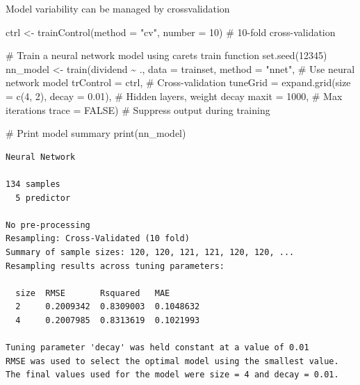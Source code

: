 \documentclass[
  letterpaper,
  DIV=11,
  numbers=noendperiod,
  oneside]{scrartcl}
\newenvironment{Shaded}{\begin{snugshade}}{\end{snugshade}}
\newcommand{\AttributeTok}[1]{\textcolor[rgb]{0.40,0.45,0.13}{#1}}
\newcommand{\CommentTok}[1]{\textcolor[rgb]{0.37,0.37,0.37}{#1}}
\newcommand{\ConstantTok}[1]{\textcolor[rgb]{0.56,0.35,0.01}{#1}}
\newcommand{\DecValTok}[1]{\textcolor[rgb]{0.68,0.00,0.00}{#1}}
\newcommand{\FloatTok}[1]{\textcolor[rgb]{0.68,0.00,0.00}{#1}}
\newcommand{\FunctionTok}[1]{\textcolor[rgb]{0.28,0.35,0.67}{#1}}
\newcommand{\NormalTok}[1]{\textcolor[rgb]{0.00,0.23,0.31}{#1}}
\newcommand{\OtherTok}[1]{\textcolor[rgb]{0.00,0.23,0.31}{#1}}
\newcommand{\SpecialCharTok}[1]{\textcolor[rgb]{0.37,0.37,0.37}{#1}}
\newcommand{\StringTok}[1]{\textcolor[rgb]{0.13,0.47,0.30}{#1}}
\begin{document}
Model variability can be managed by crossvalidation

\begin{Shaded}
\begin{Highlighting}[]
\NormalTok{ctrl }\OtherTok{\textless{}{-}} \FunctionTok{trainControl}\NormalTok{(}\AttributeTok{method =} \StringTok{"cv"}\NormalTok{, }\AttributeTok{number =} \DecValTok{10}\NormalTok{)  }\CommentTok{\# 10{-}fold cross{-}validation}
\end{Highlighting}
\end{Shaded}

\begin{Shaded}
\begin{Highlighting}[]
\CommentTok{\# Train a neural network model using caret\textquotesingle{}s \textasciigrave{}train\textasciigrave{} function}
\FunctionTok{set.seed}\NormalTok{(}\DecValTok{12345}\NormalTok{)}
\NormalTok{nn\_model }\OtherTok{\textless{}{-}} \FunctionTok{train}\NormalTok{(dividend }\SpecialCharTok{\textasciitilde{}}\NormalTok{ ., }\AttributeTok{data =}\NormalTok{ trainset,}
                  \AttributeTok{method =} \StringTok{"nnet"}\NormalTok{,  }\CommentTok{\# Use neural network model}
                  \AttributeTok{trControl =}\NormalTok{ ctrl,  }\CommentTok{\# Cross{-}validation}
                  \AttributeTok{tuneGrid =} \FunctionTok{expand.grid}\NormalTok{(}\AttributeTok{size =} \FunctionTok{c}\NormalTok{(}\DecValTok{4}\NormalTok{, }\DecValTok{2}\NormalTok{), }\AttributeTok{decay =} \FloatTok{0.01}\NormalTok{),  }\CommentTok{\# Hidden layers, weight decay}
                  \AttributeTok{maxit =} \DecValTok{1000}\NormalTok{,  }\CommentTok{\# Max iterations}
                  \AttributeTok{trace =} \ConstantTok{FALSE}\NormalTok{)  }\CommentTok{\# Suppress output during training}

\CommentTok{\# Print model summary}
\FunctionTok{print}\NormalTok{(nn\_model)}
\end{Highlighting}
\end{Shaded}

\begin{verbatim}
Neural Network 

134 samples
  5 predictor

No pre-processing
Resampling: Cross-Validated (10 fold) 
Summary of sample sizes: 120, 120, 121, 121, 120, 120, ... 
Resampling results across tuning parameters:

  size  RMSE       Rsquared   MAE      
  2     0.2009342  0.8309003  0.1048632
  4     0.2007985  0.8313619  0.1021993

Tuning parameter 'decay' was held constant at a value of 0.01
RMSE was used to select the optimal model using the smallest value.
The final values used for the model were size = 4 and decay = 0.01.
\end{verbatim}
\end{document}

